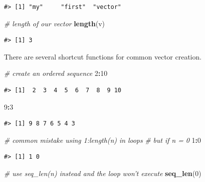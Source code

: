 \documentclass[]{book}
\newenvironment{Shaded}{\begin{snugshade}}{\end{snugshade}}
\newcommand{\KeywordTok}[1]{\textcolor[rgb]{0.13,0.29,0.53}{\textbf{#1}}}
\newcommand{\DecValTok}[1]{\textcolor[rgb]{0.00,0.00,0.81}{#1}}
\newcommand{\CommentTok}[1]{\textcolor[rgb]{0.56,0.35,0.01}{\textit{#1}}}
\newcommand{\OperatorTok}[1]{\textcolor[rgb]{0.81,0.36,0.00}{\textbf{#1}}}
\newcommand{\NormalTok}[1]{#1}
\theoremstyle{definition}
\theoremstyle{definition}
\theoremstyle{definition}
\theoremstyle{remark}
\begin{document}
\begin{verbatim}
#> [1] "my"     "first"  "vector"
\end{verbatim}

\begin{Shaded}
\begin{Highlighting}[]
\CommentTok{# length of our vector}
\KeywordTok{length}\NormalTok{(v)}
\end{Highlighting}
\end{Shaded}

\begin{verbatim}
#> [1] 3
\end{verbatim}

There are several shortcut functions for common vector creation.

\begin{Shaded}
\begin{Highlighting}[]
\CommentTok{# create an ordered sequence}
\DecValTok{2}\OperatorTok{:}\DecValTok{10}
\end{Highlighting}
\end{Shaded}

\begin{verbatim}
#> [1]  2  3  4  5  6  7  8  9 10
\end{verbatim}

\begin{Shaded}
\begin{Highlighting}[]
\DecValTok{9}\OperatorTok{:}\DecValTok{3}
\end{Highlighting}
\end{Shaded}

\begin{verbatim}
#> [1] 9 8 7 6 5 4 3
\end{verbatim}

\begin{Shaded}
\begin{Highlighting}[]
\CommentTok{# common mistake using 1:length(n) in loops}
\CommentTok{# but if n = 0}
\DecValTok{1}\OperatorTok{:}\DecValTok{0}
\end{Highlighting}
\end{Shaded}

\begin{verbatim}
#> [1] 1 0
\end{verbatim}

\begin{Shaded}
\begin{Highlighting}[]
\CommentTok{# use seq_len(n) instead and the loop won't execute}
\KeywordTok{seq_len}\NormalTok{(}\DecValTok{0}\NormalTok{)}
\end{Highlighting}
\end{Shaded}
\end{document}

